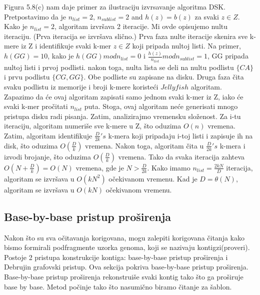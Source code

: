 \documentclass{article}
\begin{document}
Figura 5.8(c) nam daje primer za ilustraciju izvrsavanje algoritma DSK. Pretpostavimo da je $n_{list} = 2$, $n_{sublist} = 2$ and $h(z) = b(z)$ za svaki $z \in Z$. Kako je $n_{list} = 2$, algoritam izvršava 2 iteracije. Mi ovde opisujemo nultu iteraciju. (Prva iteracija se izvršava slično.) Prva faza nulte iteracije skenira sve k-mere iz Z i identifikuje svaki k-mer $z \in Z$ koji pripada nultoj listi. Na primer, $h(GG) = 10$, kako je $h(GG) mod n_{list} = 0$ i $\frac{h(z)}{n_{list}} mod n_{sublist} = 1$, GG pripada nultoj listi i prvoj podlisti. nakon toga, nulta lista se deli na nultu podlistu $\{CA\}$ i prvu podlistu $\{CG, GG\}$. Obe podliste su zapisane na disku. Druga faza čita svaku podlistu iz memorije i broji k-mere koristeći $Jellyfish$ algoritam. \\

Zapazimo da će ovaj algoritam zapisati samo jednom svaki k-mer iz Z, iako će svaki k-mer pročitati $n_{list}$ puta. Stoga, ovaj algoritam neće generisati mnogo pristupa disku radi pisanja. Zatim, analizirajmo vremensku složenost. Za i-tu iteraciju, algoritam numeriše sve k-mere u Z, što oduzima $O(n)$ vremena. Zatim, algoritam identifikuje $\frac{D}{2k}'s$ k-mera koji pripadaju i-toj listi i zapisuje ih na disk, što oduzima $O(\frac{D}{k})$ vremena. Nakon toga, algoritam  čita u $\frac{D}{2k}'s$ k-mera i izvodi brojanje, što oduzima $O(\frac{D}{k})$ vremena. Tako da svaka iteracija zahteva $O(N + \frac{D}{k}) = O(N)$ vremena, gde je $N > \frac{D}{2k}$. Kako imamo $n_{list} = \frac{2kN}{D}$ iteracija, algoritam se izvršava u $O(kN^2)$ očekivanom vremenu. Kad je $D = \theta(N)$, algoritam se izvršava u $O(kN)$ očekivanom vremenu. \\

\subsection{Base-by-base pristup proširenja}

Nakon što su sva očitavanja korigovana, mogu zalepiti korigovana čitanja kako bismo formirali podfragmente uzorka genoma, koji se nazivaju kontigzi(proveri). Postoje 2 pristupa konstrukcije kontiga: base-by-base pristup proširenja i Debrujin grafovski pristup. Ova sekcija pokriva base-by-base pristup proširenja. \\

Base-by-base pristup proširenja rekonstruiše svaki kontig tako što ga proširuje base by base. Metod počinje tako što nasumično biramo čitanje za šablon. \\
\end{document}
